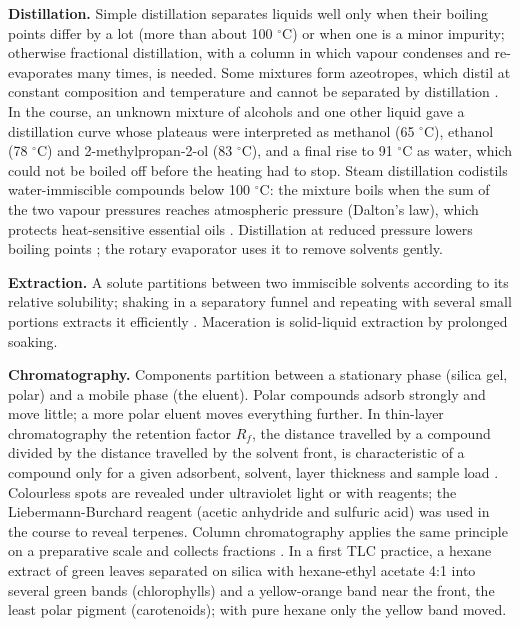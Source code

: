 \textbf{Distillation.}
Simple distillation separates liquids well
only when their boiling points differ by a
lot (more than about 100 $^\circ$C) or when
one is a minor impurity; otherwise fractional
distillation, with a column in which vapour
condenses and re-evaporates many times, is
needed. Some mixtures form azeotropes, which
distil at constant composition and
temperature and cannot be separated by
distillation \cite[Chapters 14 and
15]{pavia2002microscale}. In the course, an
unknown mixture of alcohols and one other
liquid gave a distillation curve whose
plateaus were interpreted as methanol (65
$^\circ$C), ethanol (78 $^\circ$C) and
2-methylpropan-2-ol (83 $^\circ$C), and a
final rise to 91 $^\circ$C as water, which
could not be boiled off before the heating
had to stop. Steam distillation codistils
water-immiscible compounds below 100
$^\circ$C: the mixture boils when the sum of
the two vapour pressures reaches atmospheric
pressure (Dalton's law), which protects
heat-sensitive essential oils \cite[Chapter
18]{pavia2002microscale}. Distillation at
reduced pressure lowers boiling points
\cite[Chapter 16]{pavia2002microscale}; the
rotary evaporator uses it to remove solvents
gently.

\textbf{Extraction.}
A solute partitions between two immiscible
solvents according to its relative
solubility; shaking in a separatory funnel
and repeating with several small portions
extracts it efficiently \cite[Chapter
12]{pavia2002microscale}. Maceration is
solid-liquid extraction by prolonged soaking.

\textbf{Chromatography.}
Components partition between a stationary
phase (silica gel, polar) and a mobile phase
(the eluent). Polar compounds adsorb strongly
and move little; a more polar eluent moves
everything further. In thin-layer
chromatography the retention factor $R_f$,
the distance travelled by a compound divided
by the distance travelled by the solvent
front, is characteristic of a compound only
for a given adsorbent, solvent, layer
thickness and sample load \cite[Chapter
20]{pavia2002microscale}. Colourless spots
are revealed under ultraviolet light or with
reagents; the Liebermann-Burchard reagent
(acetic anhydride and sulfuric acid) was used
in the course to reveal terpenes. Column
chromatography applies the same principle on
a preparative scale and collects fractions
\cite[Chapter 19]{pavia2002microscale}. In a
first TLC practice, a hexane extract of green
leaves separated on silica with hexane-ethyl
acetate 4:1 into several green bands
(chlorophylls) and a yellow-orange band near
the front, the least polar pigment
(carotenoids); with pure hexane only the
yellow band moved.

